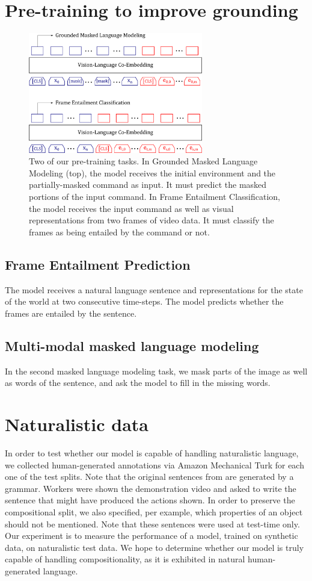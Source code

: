 \documentclass[11pt]{article}
\begin{document}
\section{Pre-training to improve grounding}
\begin{figure}
	\includegraphics[width=3in]{pre_training_model.png}
	\caption{Two of our pre-training tasks. 
	In Grounded Masked Language Modeling (top), the model receives the initial environment and the partially-masked command as input.
	It must predict the masked portions of the input command.
	In Frame Entailment Classification, the model receives the input command as well as visual representations from two frames of video data. 
	It must classify the frames as being entailed by the command or not.
}
	\label{fig:pre_training}	
\end{figure}

\subsection*{Frame Entailment Prediction}
%
The model receives a natural language sentence and representations for the state of the world at two consecutive time-steps.
%
The model predicts whether the frames are entailed by the sentence.

\subsection{Multi-modal masked language modeling}
%
In the second masked language modeling task, we mask parts of the image as well as words of the sentence, and ask the model to fill in the missing words.

\section{Naturalistic data}
In order to test whether our model is capable of handling naturalistic language, we collected human-generated annotations via Amazon Mechanical Turk for each one of the test splits.
%
Note that the original sentences from \citet{ruis2020benchmark} are generated by a grammar.
%
Workers were shown the demonstration video and asked to write the sentence that might have produced the actions shown.
%
In order to preserve the compositional split, we also specified, per example, which properties of an object should not be mentioned.
%
Note that these sentences were used at test-time only.
%
Our experiment is to measure the performance of a model, trained on synthetic data, on naturalistic test data.
%
We hope to determine whether our model is truly capable of handling compositionality, as it is exhibited in natural human-generated language. 
\end{document}
